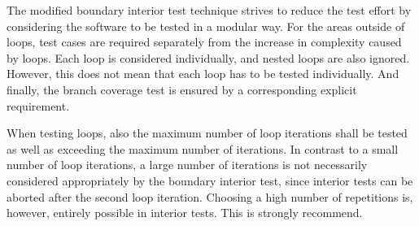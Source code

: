 	The modified boundary interior test technique strives to reduce the test effort by considering the software to be tested in a modular way. For the areas outside of loops, test cases are required separately from the increase in complexity caused by loops. Each loop is considered individually, and nested loops are also ignored. However, this does not mean that each loop has to be tested individually. And finally, the branch coverage test is ensured by a corresponding explicit requirement.	


	When testing loops, also the maximum number of loop iterations shall be tested as well as exceeding the maximum number of iterations. In contrast to a small number of loop iterations, a large number of iterations is not necessarily considered appropriately by the boundary interior test, since interior tests can be aborted after the second loop iteration. Choosing a high number of repetitions is, however, entirely possible in interior tests. This is strongly recommend.

